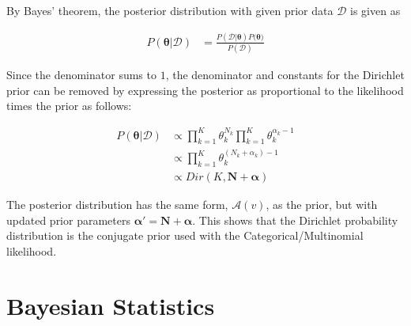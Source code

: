 By Bayes' theorem, the posterior distribution with given prior data $\mathcal{D}$ is given as

\begin{equation}
      \label{eq:probability:conjugate_priors:mult_likelihood:posterior}
      \begin{split}
            P(\boldsymbol{\theta} \vert \boldsymbol{\mathcal{D}}) &= \frac{P(\boldsymbol{\mathcal{D}} \vert \boldsymbol{\theta}) P(\boldsymbol{\theta)}}{P(\boldsymbol{\mathcal{D}})}
      \end{split}
\end{equation}

Since the denominator sums to $1$, the denominator and constants for the Dirichlet prior can be removed by expressing the posterior as proportional to the likelihood times the prior as follows:

\begin{equation}
      \label{eq:probability:conjugate_priors:mult_likelihood:posterior_propto}
      \begin{split}
            P(\boldsymbol{\theta} \vert \boldsymbol{\mathcal{D}}) &\propto \prod_{k=1}^{K} \theta_{k}^{N_{k}} \prod_{k=1}^{K} \theta_{k}^{\alpha_{k} - 1}\\
            &\propto \prod_{k=1}^{K} \theta_{k}^{(N_{k} + \alpha_{k}) - 1} \\
            &\propto Dir(K, \boldsymbol{N} + \boldsymbol{\alpha})
      \end{split}
\end{equation}

The posterior distribution has the same form, $\mathcal{A}(v)$, as the prior, but with updated prior parameters $\boldsymbol{\alpha'} = \boldsymbol{N} + \boldsymbol{\alpha}$. This shows that the Dirichlet probability distribution is the conjugate prior used with the Categorical/Multinomial likelihood.

\section{Bayesian Statistics}
\label{sec:probability:bayesian_statistics}

